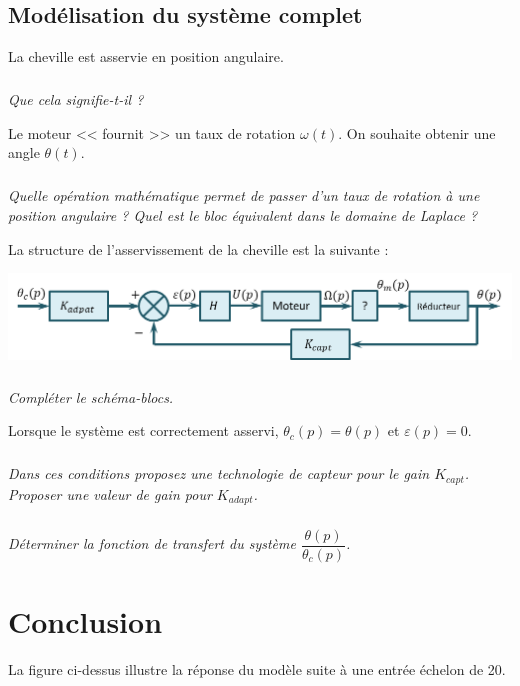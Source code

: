 \documentclass[10pt,fleqn]{article} %
\begin{document}
\begin{multicols}{2}
\subsection*{Modélisation du système complet}
La cheville est asservie en position angulaire.
\subparagraph{}\textit{Que cela signifie-t-il ?}

\vspace{.25cm}

Le moteur << fournit >> un taux de rotation $\omega(t)$. On souhaite obtenir une angle $\theta(t)$.
\subparagraph{}\textit{Quelle opération mathématique permet de passer d'un taux de rotation à une position angulaire ? Quel est le bloc équivalent  dans le domaine de Laplace ?}

La structure de l'asservissement de la cheville est la suivante :

\begin{center}
\includegraphics[width=\linewidth]{images/fig_04}
\end{center}


\subparagraph{}\textit{Compléter le schéma-blocs.}

\vspace{.25cm}
Lorsque le système est correctement asservi, $\theta_c(p)=\theta(p)$ et $\varepsilon(p)=0$.

\subparagraph{}\textit{Dans ces conditions proposez une technologie de capteur pour le gain $K_{capt}$. Proposer une valeur de gain pour $K_{adapt}$.}

\subparagraph{}\textit{Déterminer la fonction de transfert du système $\dfrac{\theta(p)}{\theta_c(p)}$.}
\section*{Conclusion}

La figure ci-dessus illustre la réponse du modèle suite à une entrée échelon de 20\degres.


\end{multicols}
\end{document}
